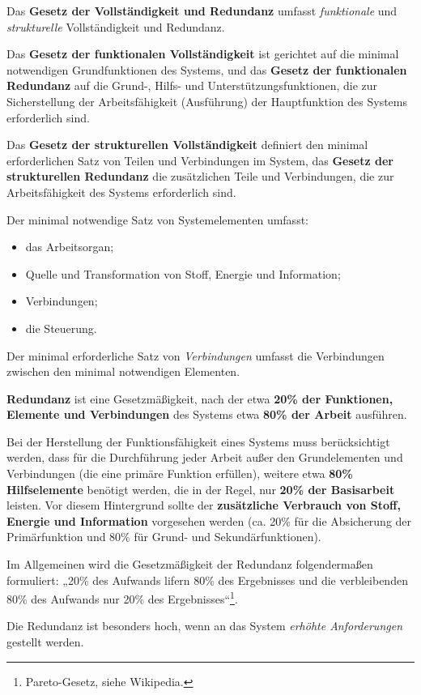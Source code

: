 \documentclass[11pt,a4paper]{article}
\begin{document}
Das \textbf{Gesetz der Vollständigkeit und Redundanz} umfasst
\emph{funktionale} und \emph{strukturelle} Vollständigkeit und Redundanz.

Das \textbf{Gesetz der funktionalen Vollständigkeit} ist gerichtet auf die
minimal notwendigen Grundfunktionen des Systems, und das \textbf{Gesetz der
  funktionalen Redundanz} auf die Grund-, Hilfs- und Unterstützungsfunktionen,
die zur Sicherstellung der Arbeitsfähigkeit (Ausführung) der Hauptfunktion des
Systems erforderlich sind.

Das \textbf{Gesetz der strukturellen Vollständigkeit} definiert den minimal
erforderlichen Satz von Teilen und Verbindungen im System, das \textbf{Gesetz
  der strukturellen Redundanz} die zusätzlichen Teile und Verbindungen, die
zur Arbeitsfähigkeit des Systems erforderlich sind.

Der minimal notwendige Satz von Systemelementen umfasst:
\begin{itemize}[noitemsep]
\item das Arbeitsorgan;
\item Quelle und Transformation von Stoff, Energie und Information;
\item Verbindungen;
\item die Steuerung.
\end{itemize}
Der minimal erforderliche Satz von \emph{Verbindungen} umfasst die
Verbindungen zwischen den minimal notwendigen Elementen.

\textbf{Redundanz} ist eine Gesetzmäßigkeit, nach der etwa \textbf{20\% der
  Funktionen, Elemente und Verbindungen} des Systems etwa \textbf{80\% der
  Arbeit} ausführen.

Bei der Herstellung der Funktionsfähigkeit eines Systems muss berücksichtigt
werden, dass für die Durchführung jeder Arbeit außer den Grundelementen und
Verbindungen (die eine primäre Funktion erfüllen), weitere etwa \textbf{80\%
  Hilfselemente} benötigt werden, die in der Regel, nur \textbf{20\% der
  Basisarbeit} leisten. Vor diesem Hintergrund sollte der \textbf{zusätzliche
  Verbrauch von Stoff, Energie und Information} vorgesehen werden (ca. 20\%
für die Absicherung der Primärfunktion und 80\% für Grund- und
Sekundärfunktionen).

Im Allgemeinen wird die Gesetzmäßigkeit der Redundanz folgendermaßen
formuliert: „20\% des Aufwands lifern 80\% des Ergebnisses und die
verbleibenden 80\% des Aufwands nur 20\% des
Ergebnisses“\footnote{Pareto-Gesetz, siehe Wikipedia.}.

Die Redundanz ist besonders hoch, wenn an das System \emph{erhöhte
  Anforderungen} gestellt werden.
\end{document}
